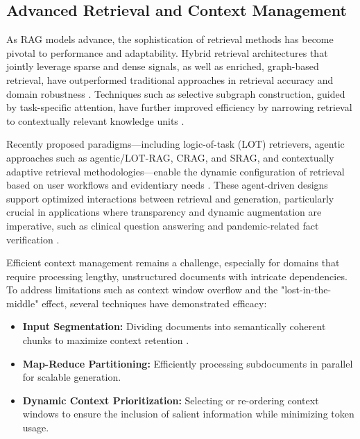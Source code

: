 \subsection{Advanced Retrieval and Context Management}

As RAG models advance, the sophistication of retrieval methods has become pivotal to performance and adaptability. Hybrid retrieval architectures that jointly leverage sparse and dense signals, as well as enriched, graph-based retrieval, have outperformed traditional approaches in retrieval accuracy and domain robustness \cite{ref3, ref8, ref10, ref12, ref29, ref31, ref37, ref47, ref48, ref52, ref54}. Techniques such as selective subgraph construction, guided by task-specific attention, have further improved efficiency by narrowing retrieval to contextually relevant knowledge units \cite{ref48, ref52}.

Recently proposed paradigms—including logic-of-task (LOT) retrievers, agentic approaches such as agentic/LOT-RAG, CRAG, and SRAG, and contextually adaptive retrieval methodologies—enable the dynamic configuration of retrieval based on user workflows and evidentiary needs \cite{ref54, ref64}. These agent-driven designs support optimized interactions between retrieval and generation, particularly crucial in applications where transparency and dynamic augmentation are imperative, such as clinical question answering and pandemic-related fact verification \cite{ref54, ref64}.

Efficient context management remains a challenge, especially for domains that require processing lengthy, unstructured documents with intricate dependencies. To address limitations such as context window overflow and the "lost-in-the-middle" effect, several techniques have demonstrated efficacy:

\begin{itemize}
    \item \textbf{Input Segmentation:} Dividing documents into semantically coherent chunks to maximize context retention \cite{ref5, ref10, ref15, ref16, ref43, ref49, ref52, ref54, ref55}.
    \item \textbf{Map-Reduce Partitioning:} Efficiently processing subdocuments in parallel for scalable generation.
    \item \textbf{Dynamic Context Prioritization:} Selecting or re-ordering context windows to ensure the inclusion of salient information while minimizing token usage.
\end{itemize}

